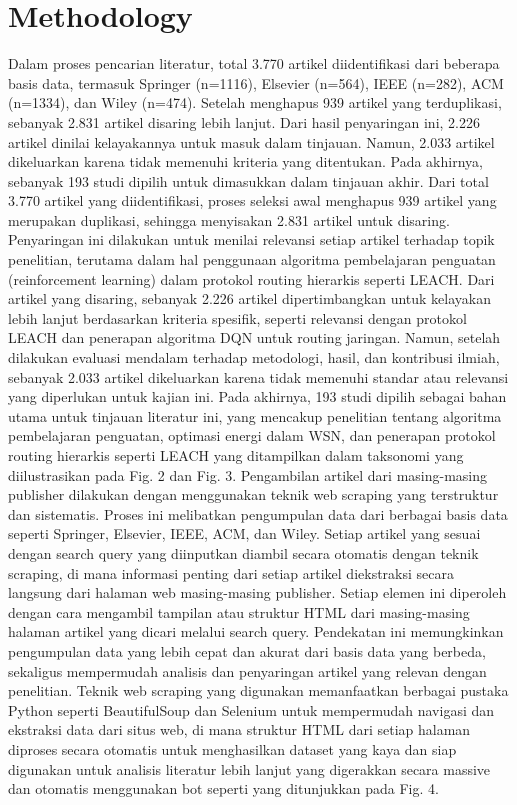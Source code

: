 \documentclass[conference]{IEEEtran}
\begin{document}
\section{Methodology}
Dalam proses pencarian literatur, total 3.770 artikel diidentifikasi dari beberapa basis data, termasuk Springer (n=1116), Elsevier (n=564), IEEE (n=282), ACM (n=1334), dan Wiley (n=474). Setelah menghapus 939 artikel yang terduplikasi, sebanyak 2.831 artikel disaring lebih lanjut. Dari hasil penyaringan ini, 2.226 artikel dinilai kelayakannya untuk masuk dalam tinjauan. Namun, 2.033 artikel dikeluarkan karena tidak memenuhi kriteria yang ditentukan. Pada akhirnya, sebanyak 193 studi dipilih untuk dimasukkan dalam tinjauan akhir.
Dari total 3.770 artikel yang diidentifikasi, proses seleksi awal menghapus 939 artikel yang merupakan duplikasi, sehingga menyisakan 2.831 artikel untuk disaring. Penyaringan ini dilakukan untuk menilai relevansi setiap artikel terhadap topik penelitian, terutama dalam hal penggunaan algoritma pembelajaran penguatan (reinforcement learning) dalam protokol routing hierarkis seperti LEACH. Dari artikel yang disaring, sebanyak 2.226 artikel dipertimbangkan untuk kelayakan lebih lanjut berdasarkan kriteria spesifik, seperti relevansi dengan protokol LEACH dan penerapan algoritma DQN untuk routing jaringan. Namun, setelah dilakukan evaluasi mendalam terhadap metodologi, hasil, dan kontribusi ilmiah, sebanyak 2.033 artikel dikeluarkan karena tidak memenuhi standar atau relevansi yang diperlukan untuk kajian ini. Pada akhirnya, 193 studi dipilih sebagai bahan utama untuk tinjauan literatur ini, yang mencakup penelitian tentang algoritma pembelajaran penguatan, optimasi energi dalam WSN, dan penerapan protokol routing hierarkis seperti LEACH yang ditampilkan dalam taksonomi yang diilustrasikan pada Fig. 2 dan Fig. 3.
Pengambilan artikel dari masing-masing publisher dilakukan dengan menggunakan teknik web scraping yang terstruktur dan sistematis. Proses ini melibatkan pengumpulan data dari berbagai basis data seperti Springer, Elsevier, IEEE, ACM, dan Wiley. Setiap artikel yang sesuai dengan search query yang diinputkan diambil secara otomatis dengan teknik scraping, di mana informasi penting dari setiap artikel diekstraksi secara langsung dari halaman web masing-masing publisher. Setiap elemen ini diperoleh dengan cara mengambil tampilan atau struktur HTML dari masing-masing halaman artikel yang dicari melalui search query. Pendekatan ini memungkinkan pengumpulan data yang lebih cepat dan akurat dari basis data yang berbeda, sekaligus mempermudah analisis dan penyaringan artikel yang relevan dengan penelitian. Teknik web scraping yang digunakan memanfaatkan berbagai pustaka Python seperti BeautifulSoup dan Selenium untuk mempermudah navigasi dan ekstraksi data dari situs web, di mana struktur HTML dari setiap halaman diproses secara otomatis untuk menghasilkan dataset yang kaya dan siap digunakan untuk analisis literatur lebih lanjut yang digerakkan secara massive dan otomatis menggunakan bot seperti yang ditunjukkan pada Fig. 4.




\vspace{12pt}
\end{document}
